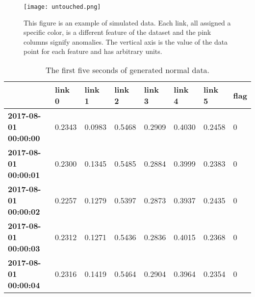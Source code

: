 \documentclass[5p]{elsarticle}
\begin{document}
\begin{figure*}[htbp]
    \centering
    \texttt{[image: untouched.png]}
    \caption{This figure is an example of simulated data. Each link, all assigned a specific color, is a different feature of the dataset and the pink columns signify anomalies. The vertical axis is the value of the data point for each feature and has arbitrary units.}
    \label{fig:untouched}
\end{figure*}


\begin{table}[htbp]
\centering
\caption{The first five seconds of generated normal data.}
\label{table:first5s}
\resizebox{\linewidth}{!} {%
\begin{tabular}{@{}llllllll@{}}
\toprule
                             & \textbf{link 0} & \textbf{link 1} & \textbf{link 2} & \textbf{link 3} & \textbf{link 4} & \textbf{link 5} & \textbf{flag} \\ \midrule
\textbf{2017-08-01 00:00:00} & 0.2343          & 0.0983          & 0.5468          & 0.2909          & 0.4030          & 0.2458          & 0             \\
\textbf{2017-08-01 00:00:01} & 0.2300          & 0.1345          & 0.5485          & 0.2884          & 0.3999          & 0.2383          & 0             \\
\textbf{2017-08-01 00:00:02} & 0.2257          & 0.1279          & 0.5397          & 0.2873          & 0.3937          & 0.2435          & 0             \\
\textbf{2017-08-01 00:00:03} & 0.2312          & 0.1271          & 0.5436          & 0.2836          & 0.4015          & 0.2368          & 0             \\
\textbf{2017-08-01 00:00:04} & 0.2316          & 0.1419          & 0.5464          & 0.2904          & 0.3964          & 0.2354          & 0             \\ \bottomrule
\end{tabular}%
}
\end{table}
\end{document}
